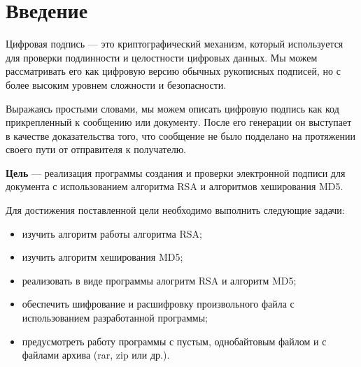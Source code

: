\chapter*{Введение}

Цифровая подпись --- это криптографический механизм, который используется для проверки подлинности и целостности цифровых данных. Мы можем рассматривать его как цифровую версию обычных рукописных подписей, но с более высоким уровнем сложности и безопасности.

Выражаясь простыми словами, мы можем описать цифровую подпись как код прикрепленный к сообщению или документу. После его генерации он выступает в качестве доказательства того, что сообщение не было подделано на протяжении своего пути от отправителя к получателю.

\textbf{Цель} --- реализация программы создания и проверки электронной подписи для документа с использованием алгоритма RSA и алгоритмов хеширования MD5.

Для достижения поставленной цели необходимо выполнить следующие задачи:
\begin{itemize}[label=---]
    \item изучить алгоритм работы алгоритма RSA;
    \item изучить алгоритм хеширования MD5;
    \item реализовать в виде программы алогритм RSA и алгоритм MD5;
    \item обеспечить шифрование и расшифровку произвольного файла с использованием разработанной программы;
    \item предусмотреть работу программы с пустым, однобайтовым файлом и с файлами архива (rar, zip или др.).
\end{itemize}
